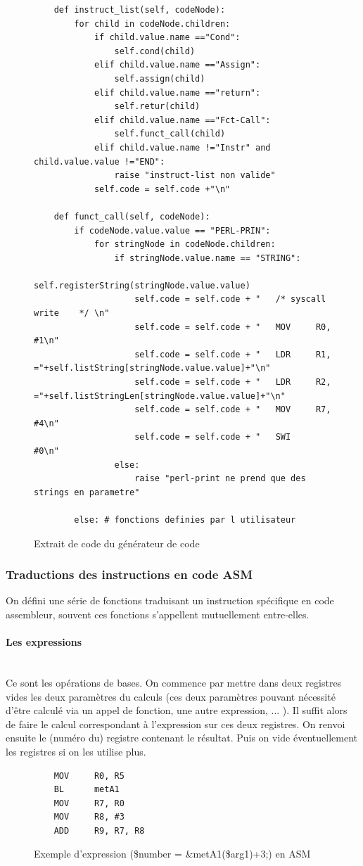 \documentclass[a4paper,10pt]{article}
\begin{document}
	\begin{figure}[H]
\begin{lstlisting}
	def instruct_list(self, codeNode):
		for child in codeNode.children:
			if child.value.name =="Cond":
				self.cond(child)
			elif child.value.name =="Assign":
				self.assign(child)
			elif child.value.name =="return":
				self.retur(child)
			elif child.value.name =="Fct-Call":
				self.funct_call(child)
			elif child.value.name !="Instr" and child.value.value !="END":
				raise "instruct-list non valide"
			self.code = self.code +"\n"
				
	def funct_call(self, codeNode):
		if codeNode.value.value == "PERL-PRIN":
			for stringNode in codeNode.children:
				if stringNode.value.name == "STRING":
					self.registerString(stringNode.value.value)
					self.code = self.code + "	/* syscall write	*/ \n"
					self.code = self.code + "	MOV 	R0, #1\n"
					self.code = self.code + "	LDR 	R1, ="+self.listString[stringNode.value.value]+"\n"
					self.code = self.code + "	LDR 	R2, ="+self.listStringLen[stringNode.value.value]+"\n"
					self.code = self.code + "	MOV 	R7, #4\n"
					self.code = self.code + "	SWI 	#0\n"
				else:
					raise "perl-print ne prend que des strings en parametre"
			
		else: # fonctions definies par l utilisateur
\end{lstlisting}
\fontfamily{}
\caption{Extrait de code du générateur de code}
\label{lst:codeGeneration}
\end{figure}


	\subsubsection{Traductions des instructions en code ASM}
		On défini une série de fonctions traduisant un instruction spécifique en code assembleur, souvent ces fonctions s'appellent mutuellement entre-elles.\\
		\paragraph{Les expressions}~\\
			Ce sont les opérations de bases. On commence par mettre dans deux registres vides les deux paramètres du calculs (ces deux paramètres pouvant nécessité d'être calculé via un appel de fonction, une autre expression, ... ). Il suffit alors de faire le calcul correspondant à l'expression sur ces deux registres. On renvoi ensuite le (numéro du) registre contenant le résultat. Puis on vide éventuellement les registres si on les utilise plus.
				\begin{figure}[H]
\begin{lstlisting}
	MOV 	R0, R5 		
	BL		metA1		
	MOV 	R7, R0		
	MOV 	R8, #3		
	ADD		R9, R7, R8	
\end{lstlisting}
\fontfamily{}
\caption{Exemple d'expression (\$number = \&metA1(\$arg1)+3;) en ASM}
\label{lst:ExExpression}
\end{figure}
\end{document}
